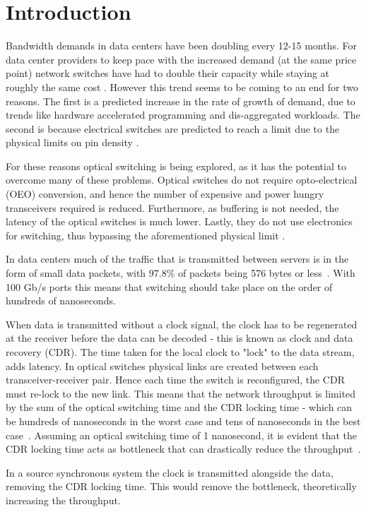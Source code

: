 \chapter{Introduction}
Bandwidth demands in data centers have been doubling every 12-15 months. For
data center providers to keep pace with the increased demand (at the same price
point) network switches have had to double their capacity while staying at
roughly the same cost \cite{singh2016jupiter}. However this trend seems to be
coming to an end for two reasons. The first is a predicted increase in the rate
of growth of demand, due to trends like hardware accelerated programming and
dis-aggregated workloads. The second is because electrical switches are
predicted to reach a limit due to the physical limits on pin density
\cite{ballani2018bridging}.

For these reasons optical switching is being explored, as it has the potential
to overcome many of these problems. Optical switches do not require
opto-electrical (OEO) conversion, and hence the number of expensive and power
hungry transceivers required is reduced. Furthermore, as buffering is not
needed, the latency of the optical switches is much lower. Lastly, they do not
use electronics for switching, thus bypassing the aforementioned physical limit
\cite{ballani2018bridging}. 

In data centers much of the traffic that is transmitted between servers is in
the form of small data packets, with 97.8\% of packets being 576 bytes or
less~\cite{data_size}. With 100 Gb/s ports this means that switching should
take place on the order of hundreds of nanoseconds. 

When data is transmitted without a clock signal, the clock has to be
regenerated at the receiver before the data can be decoded - this is known as
clock and data recovery (CDR). The time taken for the local clock to "lock" to
the data stream, adds latency. 
In optical switches physical links are created between each
transceiver-receiver pair. Hence each time the switch is reconfigured, the CDR
must re-lock to the new link.  This means that the network throughput is
limited by the sum of the optical switching time and the CDR locking time -
which can be hundreds of nanoseconds in the worst case and tens of
nanoseconds in the best case~\cite{Chen:18}. Assuming an optical switching time
of 1 nanosecond, it is evident that the CDR locking time acts as bottleneck
that can drastically reduce the throughput~\cite{kari_phase}.

In a source synchronous system the clock is transmitted alongside the data,
removing the CDR locking time. This would remove the bottleneck, theoretically
increasing the throughput.

